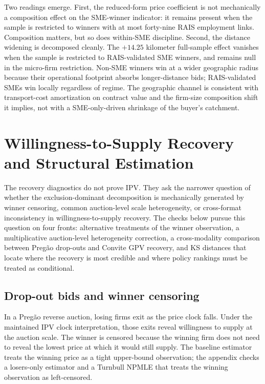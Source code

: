 \documentclass[12pt]{article}
\begin{document}
Two readings emerge. First, the reduced-form price coefficient is not
mechanically a composition effect on the SME-winner indicator: it remains
present when the sample is restricted to winners with at most forty-nine
RAIS employment links. Composition matters, but so does within-SME
discipline. Second, the distance widening is decomposed cleanly. The
\(+14.25\) kilometer full-sample effect vanishes when the sample is
restricted to RAIS-validated SME winners, and remains null in the
micro-firm restriction. Non-SME winners win at a wider geographic radius
because their operational footprint absorbs longer-distance bids;
RAIS-validated SMEs win locally regardless of regime. The geographic
channel is consistent with transport-cost amortization on contract value
and the firm-size composition shift it implies, not with a SME-only-driven
shrinkage of the buyer's catchment.

\section{Willingness-to-Supply Recovery and Structural Estimation}

The recovery diagnostics do not prove IPV. They ask the narrower question
of whether the exclusion-dominant decomposition is mechanically generated
by winner censoring, common auction-level scale heterogeneity, or
cross-format inconsistency in willingness-to-supply recovery. The checks
below pursue this question on four fronts: alternative treatments of the
winner observation, a multiplicative auction-level heterogeneity
correction, a cross-modality comparison between Preg\~ao drop-outs and
Convite GPV recovery, and KS distances that locate where the recovery is
most credible and where policy rankings must be treated as conditional.

\subsection{Drop-out bids and winner censoring}

In a Preg\~ao reverse auction, losing firms exit as the price clock falls. Under
the maintained IPV clock interpretation, those exits reveal willingness to
supply at the auction scale. The winner is censored because the winning firm
does not need to reveal the lowest price at which it would still supply. The
baseline estimator treats the winning price as a tight upper-bound observation;
the appendix checks a losers-only estimator and a Turnbull NPMLE
\citep{turnbull1976} that treats the winning observation as left-censored.
\end{document}
